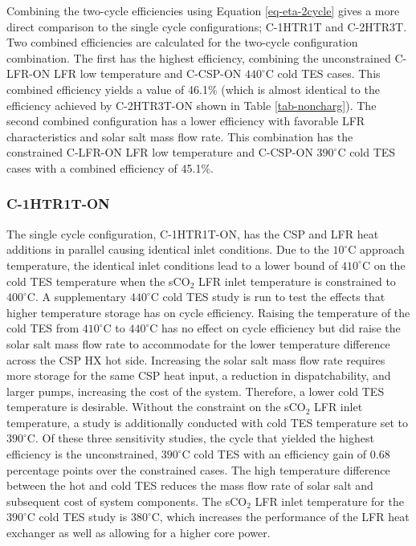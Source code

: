 \begin{paracol}{2}
Combining the two-cycle efficiencies using Equation \ref{eq-eta-2cycle} gives a more direct comparison to the single cycle configurations; C-1HTR1T and C-2HTR3T. Two combined efficiencies are calculated for the two-cycle configuration combination. The first has the highest efficiency, combining the unconstrained C-LFR-ON LFR low temperature and C-CSP-ON $440^{\circ}$C cold TES cases. This combined efficiency yields a value of 46.1\% (which is almost identical to the efficiency achieved by C-2HTR3T-ON shown in Table \ref{tab-noncharg}). The second combined configuration has a lower efficiency with favorable LFR characteristics and solar salt mass flow rate. This combination has the constrained C-LFR-ON LFR low temperature and C-CSP-ON $390^{\circ}$C cold TES cases with a combined efficiency of 45.1\%. 


\subsubsection{C-1HTR1T-ON}
The single cycle configuration, C-1HTR1T-ON, has the CSP and LFR heat additions in parallel causing identical inlet conditions. Due to the $10^{\circ}$C approach temperature, the identical inlet conditions lead to a lower bound of $410^{\circ}$C on the cold TES temperature when the sCO$_2$ LFR inlet temperature is constrained to $400^{\circ}$C. A supplementary $440^{\circ}$C cold TES study is run to test the effects that higher temperature storage has on cycle efficiency. Raising the temperature of the cold TES from $410^{\circ}$C to $440^{\circ}$C has no effect on cycle efficiency but did raise the solar salt mass flow rate to accommodate for the lower temperature difference across the CSP HX hot side. Increasing the solar salt mass flow rate requires more storage for the same CSP heat input, a reduction in dispatchability, and larger pumps, increasing the cost of the system. Therefore, a lower cold TES temperature is desirable. Without the constraint on the sCO$_2$ LFR inlet temperature, a study is additionally conducted with cold TES temperature set to $390^{\circ}$C. Of these three sensitivity studies, the cycle that yielded the highest efficiency is the unconstrained, $390^{\circ}$C cold TES with an efficiency gain of 0.68 percentage points over the constrained cases. The high temperature difference between the hot and cold TES reduces the mass flow rate of solar salt and subsequent cost of system components. The sCO$_2$ LFR inlet temperature for the $390^{\circ}$C cold TES study is $380^{\circ}$C, which increases the performance of the LFR heat exchanger as well as allowing for a higher core power. 


\end{paracol}
